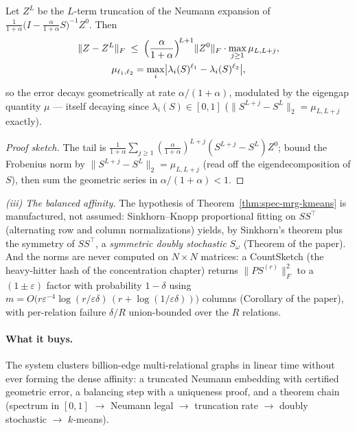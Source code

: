 \begin{lemma}\label{lem:spec-mrg-trunc}
Let $Z^L$ be the $L$-term truncation of the Neumann expansion of
$\frac{1}{1+\alpha}\bigl(I - \frac{\alpha}{1+\alpha}S\bigr)^{-1} Z^0$. Then
\begin{gather*}
\|Z - Z^L\|_F \;\le\;
\Bigl(\frac{\alpha}{1+\alpha}\Bigr)^{\!L+1} \|Z^0\|_F \cdot \max_{j \ge 1}
\mu_{L, L+j},\\
\mu_{\ell_1, \ell_2} = \max_i \bigl|\lambda_i(S)^{\ell_1} -
\lambda_i(S)^{\ell_2}\bigr|,
\end{gather*}
so the error decays geometrically at rate $\alpha/(1+\alpha)$, modulated by
the eigengap quantity $\mu$ --- itself decaying since $\lambda_i(S) \in [0,1]$
($\|S^{L+j} - S^L\|_2 = \mu_{L,L+j}$ exactly). \eop
\end{lemma}

\begin{proof}[Proof sketch]
The tail is $\frac{1}{1+\alpha}\sum_{j \ge 1}
(\frac{\alpha}{1+\alpha})^{L+j}(S^{L+j} - S^L) Z^0$; bound the Frobenius
norm by $\|S^{L+j} - S^L\|_2 = \mu_{L,L+j}$ (read off the eigendecomposition
of $S$), then sum the geometric series in $\alpha/(1+\alpha) < 1$.
\end{proof}

\emph{(iii) The balanced affinity.} The hypothesis of
Theorem~\ref{thm:spec-mrg-kmeans} is manufactured, not assumed:
Sinkhorn--Knopp proportional fitting on $S S^{\top}$ (alternating row and
column normalizations) yields, by Sinkhorn's theorem plus the symmetry of
$S S^{\top}$, a \emph{symmetric doubly stochastic} $S_\omega$ (Theorem of
the paper). And the norms are never computed on $N \times N$ matrices: a
CountSketch (the heavy-hitter hash of the concentration chapter) returns
$\|P S^{(r)}\|_F^2$ to a $(1 \pm \varepsilon)$ factor with probability $1 -
\delta$ using $m = O\bigl(r\varepsilon^{-4}\log(r/\varepsilon\delta)\,(r +
\log(1/\varepsilon\delta))\bigr)$ columns (Corollary of the paper), with
per-relation failure $\delta/R$ union-bounded over the $R$ relations.

\paragraph{What it buys.}
The system clusters billion-edge multi-relational graphs in linear time without ever forming the dense affinity: a truncated Neumann embedding with
certified geometric error, a balancing step with a uniqueness proof, and a theorem chain (spectrum in $[0,1]$ $\to$ Neumann legal $\to$ truncation
rate $\to$ doubly stochastic $\to$ $k$-means).

